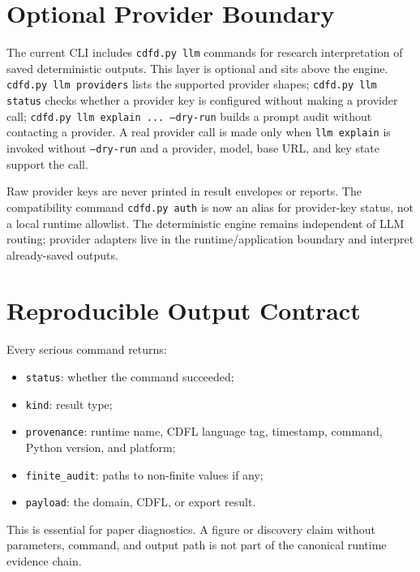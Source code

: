 \documentclass[12pt,a4paper]{article}
\begin{document}
\section{Optional Provider Boundary}
The current CLI includes \texttt{cdfd.py llm} commands for research
interpretation of saved deterministic outputs. This layer is optional and sits
above the engine. \texttt{cdfd.py llm providers} lists the supported provider
shapes; \texttt{cdfd.py llm status} checks whether a provider key is configured
without making a provider call; \texttt{cdfd.py llm explain ... --dry-run}
builds a prompt audit without contacting a provider. A real provider call is
made only when \texttt{llm explain} is invoked without \texttt{--dry-run} and a
provider, model, base URL, and key state support the call.

Raw provider keys are never printed in result envelopes or reports. The
compatibility command \texttt{cdfd.py auth} is now an alias for provider-key
status, not a local runtime allowlist. The deterministic engine remains
independent of LLM routing; provider adapters live in the runtime/application
boundary and interpret already-saved outputs.

\section{Reproducible Output Contract}
Every serious command returns:
\begin{itemize}
    \item \texttt{status}: whether the command succeeded;
    \item \texttt{kind}: result type;
    \item \texttt{provenance}: runtime name, CDFL language tag, timestamp,
    command, Python version, and platform;
    \item \texttt{finite\_audit}: paths to non-finite values if any;
    \item \texttt{payload}: the domain, CDFL, or export result.
\end{itemize}
This is essential for paper diagnostics. A figure or discovery claim without
parameters, command, and output path is not part of the canonical runtime
evidence chain.
\end{document}
